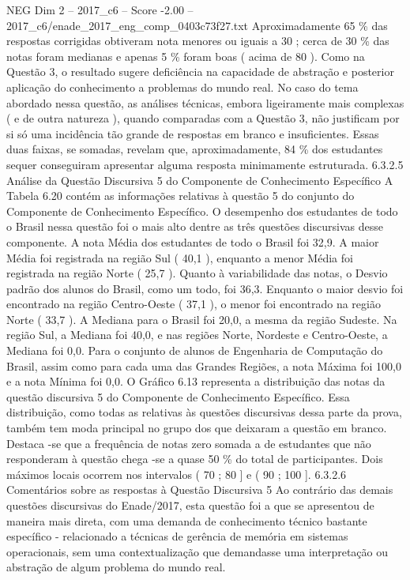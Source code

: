 \begin{textsample}{NEG Dim 2 – 2017\_c6 – Score -2.00 – 2017\_c6/enade\_2017\_eng\_comp\_0403c73f27.txt}
Aproximadamente 65 \% das respostas corrigidas obtiveram nota menores ou iguais a 30 ; cerca de 30 \% das notas foram medianas e apenas 5 \% foram boas ( acima de 80 ).
Como na Questão 3, o resultado sugere deficiência na capacidade de abstração e posterior aplicação do conhecimento a problemas do mundo real.
No caso do tema abordado nessa questão, as análises técnicas, embora ligeiramente mais complexas ( e de outra natureza ), quando comparadas com a Questão 3, não justificam por si só uma incidência tão grande de respostas em branco e insuficientes.
Essas duas faixas, se somadas, revelam que, aproximadamente, 84 \% dos estudantes sequer conseguiram apresentar alguma resposta minimamente estruturada. 6.3.2.5 Análise da Questão Discursiva 5 do Componente de Conhecimento Específico A Tabela 6.20 contém as informações relativas à questão 5 do conjunto do Componente de Conhecimento Específico.
O desempenho dos estudantes de todo o Brasil nessa questão foi o mais alto dentre as três questões discursivas desse componente.
A nota Média dos estudantes de todo o Brasil foi 32,9.
A maior Média foi registrada na região Sul ( 40,1 ), enquanto a menor Média foi registrada na região Norte ( 25,7 ).
Quanto à variabilidade das notas, o Desvio padrão dos alunos do Brasil, como um todo, foi 36,3.
Enquanto o maior desvio foi encontrado na região Centro-Oeste ( 37,1 ), o menor foi encontrado na região Norte ( 33,7 ).
A Mediana para o Brasil foi 20,0, a mesma da região Sudeste.
Na região Sul, a Mediana foi 40,0, e nas regiões Norte, Nordeste e Centro-Oeste, a Mediana foi 0,0.
Para o conjunto de alunos de Engenharia de Computação do Brasil, assim como para cada uma das Grandes Regiões, a nota Máxima foi 100,0 e a nota Mínima foi 0,0.
O Gráfico 6.13 representa a distribuição das notas da questão discursiva 5 do Componente de Conhecimento Específico.
Essa distribuição, como todas as relativas às questões discursivas dessa parte da prova, também tem moda principal no grupo dos que deixaram a questão em branco.
Destaca -se que a frequência de notas zero somada a de estudantes que não responderam à questão chega -se a quase 50 \% do total de participantes.
Dois máximos locais ocorrem nos intervalos ( 70 ; 80 ] e ( 90 ; 100 ]. 6.3.2.6 Comentários sobre as respostas à Questão Discursiva 5 Ao contrário das demais questões discursivas do Enade/2017, esta questão foi a que se apresentou de maneira mais direta, com uma demanda de conhecimento técnico bastante específico - relacionado a técnicas de gerência de memória em sistemas operacionais, sem uma contextualização que demandasse uma interpretação ou abstração de algum problema do mundo real.

\end{textsample}
